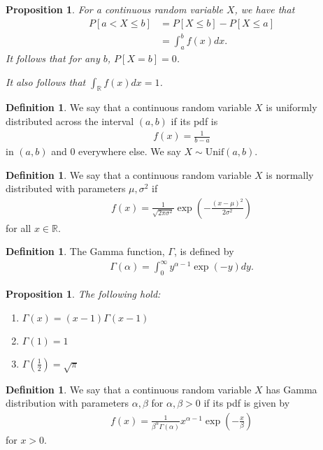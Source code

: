 \documentclass[11pt]{amsart}
\newtheorem{proposition}[theorem]{Proposition}
\theoremstyle{definition}
\newtheorem{definition}[theorem]{Definition}
\numberwithin{equation}{section}
\begin{document}
\begin{proposition}
    For a continuous random variable $X$, we have that
    \begin{align*}
        P[a<X\le b]&=P[X\le b]-P[X\le a]\\
        &=\int_{a}^bf(x)dx.
    \end{align*}
    It follows that for any $b$, $P[X=b]=0$.

    It also follows that $\int_\mathbb R f(x)dx=1$.
\end{proposition}
\begin{definition}
    We say that a continuous random variable $X$ is uniformly distributed across the interval $(a,b)$ if its pdf is
\begin{align*}         f(x)=\frac{1}{b-a} \end{align*} in $(a,b)$ and $0$ everywhere else. We say $X\sim\mathrm{Unif}(a,b)$.
\end{definition}
\begin{definition}
    We say that a continuous random variable $X$ is normally distributed with parameters $\mu,\sigma^2$ if \begin{align*}
        f(x)=\frac{1}{\sqrt{2\pi\sigma^2}}\exp\left(-\frac{(x-\mu)^2}{2\sigma^2}\right)
    \end{align*}
    for all $x\in\mathbb R$.
\end{definition}
\begin{definition}
    The Gamma function, $\Gamma$, is defined by 
    \begin{align*}
        \Gamma(\alpha)=\int_0^\infty y^{\alpha-1}\exp(-y)dy.
    \end{align*}
\end{definition}
\begin{proposition}
    The following hold:
    \begin{enumerate}
        \item [(i)] $\Gamma(x)=(x-1)\Gamma(x-1)$
        \item [(ii)] $\Gamma(1)=1$
        \item [(iii)] $\Gamma(\frac{1}{2})=\sqrt\pi$
    \end{enumerate}
\end{proposition}
\begin{definition}
    We say that a continuous random variable $X$ has Gamma distribution with parameters $\alpha,\beta$ for $\alpha,\beta>0$ if its pdf is given by
\begin{align*}         f(x)=\frac{1}{\beta^\alpha\Gamma(\alpha)} x^{\alpha-1}\exp(-\frac{x}{\beta})
    \end{align*}
    for $x>0$.
\end{definition}
\end{document}
